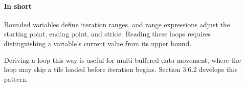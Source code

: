 \paragraph*{In short}

Bounded variables define iteration ranges, and range expressions adjust the starting point, ending point, and stride. Reading these loops requires distinguishing a variable's current value from its upper bound.

Deriving a loop this way is useful for multi-buffered data movement, where the loop may skip a tile loaded before iteration begins. Section 3.6.2 develops this pattern.
